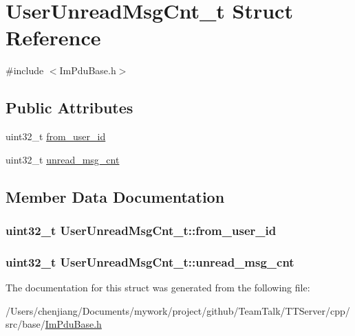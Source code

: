 \hypertarget{struct_user_unread_msg_cnt__t}{}\section{User\+Unread\+Msg\+Cnt\+\_\+t Struct Reference}
\label{struct_user_unread_msg_cnt__t}


{\ttfamily \#include $<$Im\+Pdu\+Base.\+h$>$}

\subsection*{Public Attributes}
\begin{DoxyCompactItemize}
\item 
uint32\+\_\+t \hyperlink{struct_user_unread_msg_cnt__t_acee3ff12cbc38e70c8fc08e3bd8a34ed}{from\+\_\+user\+\_\+id}
\item 
uint32\+\_\+t \hyperlink{struct_user_unread_msg_cnt__t_a21507b30bb0f5c38a06f62550f41d611}{unread\+\_\+msg\+\_\+cnt}
\end{DoxyCompactItemize}


\subsection{Member Data Documentation}
\hypertarget{struct_user_unread_msg_cnt__t_acee3ff12cbc38e70c8fc08e3bd8a34ed}{}
\subsubsection[{from\+\_\+user\+\_\+id}]{\setlength{\rightskip}{0pt plus 5cm}uint32\+\_\+t User\+Unread\+Msg\+Cnt\+\_\+t\+::from\+\_\+user\+\_\+id}\label{struct_user_unread_msg_cnt__t_acee3ff12cbc38e70c8fc08e3bd8a34ed}
\hypertarget{struct_user_unread_msg_cnt__t_a21507b30bb0f5c38a06f62550f41d611}{}
\subsubsection[{unread\+\_\+msg\+\_\+cnt}]{\setlength{\rightskip}{0pt plus 5cm}uint32\+\_\+t User\+Unread\+Msg\+Cnt\+\_\+t\+::unread\+\_\+msg\+\_\+cnt}\label{struct_user_unread_msg_cnt__t_a21507b30bb0f5c38a06f62550f41d611}


The documentation for this struct was generated from the following file\+:\begin{DoxyCompactItemize}
\item 
/\+Users/chenjiang/\+Documents/mywork/project/github/\+Team\+Talk/\+T\+T\+Server/cpp/src/base/\hyperlink{_im_pdu_base_8h}{Im\+Pdu\+Base.\+h}\end{DoxyCompactItemize}

